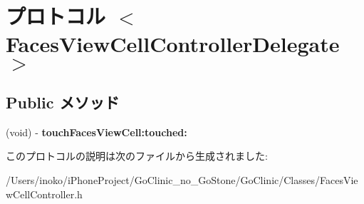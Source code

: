 \hypertarget{protocol_faces_view_cell_controller_delegate-p}{
\section{プロトコル $<$FacesViewCellControllerDelegate$>$}
\label{protocol_faces_view_cell_controller_delegate-p}
}
\subsection*{Public メソッド}
\begin{DoxyCompactItemize}
\item 
\hypertarget{protocol_faces_view_cell_controller_delegate-p_ab81c2eba6f5c881907e060ee453388b0}{
(void) -\/ {\bfseries touchFacesViewCell:touched:}}
\label{protocol_faces_view_cell_controller_delegate-p_ab81c2eba6f5c881907e060ee453388b0}

\end{DoxyCompactItemize}


このプロトコルの説明は次のファイルから生成されました:\begin{DoxyCompactItemize}
\item 
/Users/inoko/iPhoneProject/GoClinic\_\-no\_\-GoStone/GoClinic/Classes/FacesViewCellController.h\end{DoxyCompactItemize}
